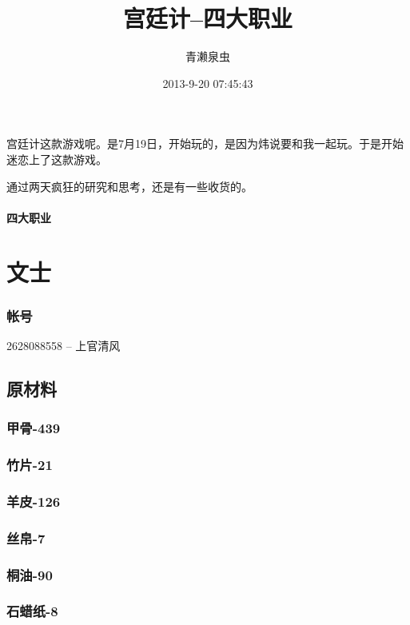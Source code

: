 \documentclass[12pt,a4paper,landscape]{article}
\begin{document}
\begin{CJK}{UTF8}{gbsn}
\title{宫廷计--四大职业}
\author{青濑泉虫}
\date{2013-9-20 07:45:43}


\maketitle



宫廷计这款游戏呢。是7月19日，开始玩的，是因为炜说要和我一起玩。于是开始迷恋上了这款游戏。

通过两天疯狂的研究和思考，还是有一些收货的。

\paragraph{四大职业}

\section{文士}
\subsubsection{帐号}
2628088558 -- 上官清风
\subsection{原材料}
\subsubsection{甲骨-439}
\subsubsection{竹片-21}
\subsubsection{羊皮-126}
\subsubsection{丝帛-7}
\subsubsection{桐油-90}
\subsubsection{石蜡纸-8}

\end{CJK}
\end{document}
